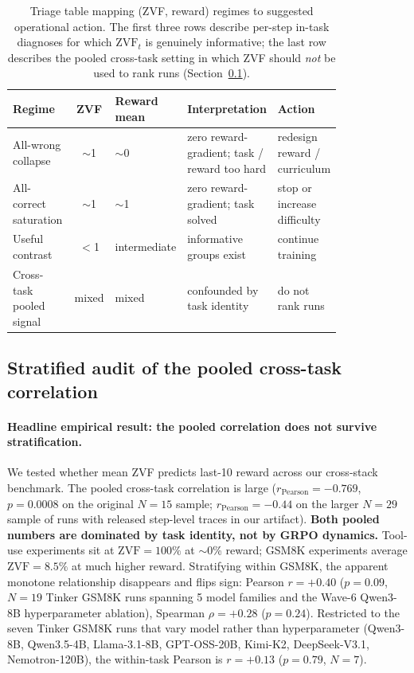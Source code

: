\documentclass{article}
\begin{document}
\begin{table}[t]
\centering\small
\setlength{\tabcolsep}{5pt}
\begin{tabular}{p{0.22\linewidth}cp{0.13\linewidth}p{0.27\linewidth}p{0.20\linewidth}}
\toprule
\textbf{Regime} & \textbf{ZVF} & \textbf{Reward mean} & \textbf{Interpretation} & \textbf{Action} \\
\midrule
All-wrong collapse & $\sim$1 & $\sim$0 &
zero reward-gradient; task / reward too hard &
redesign reward / curriculum \\
All-correct saturation & $\sim$1 & $\sim$1 &
zero reward-gradient; task solved &
stop or increase difficulty \\
Useful contrast & $<$1 & intermediate &
informative groups exist &
continue training \\
Cross-task pooled signal & mixed & mixed &
confounded by task identity &
do not rank runs \\
\bottomrule
\end{tabular}
\caption{Triage table mapping (ZVF, reward) regimes to suggested
operational action. The first three rows describe per-step in-task
diagnoses for which $\mathrm{ZVF}_t$ is genuinely informative; the last
row describes the pooled cross-task setting in which ZVF should
\emph{not} be used to rank runs (Section~\ref{sec:zvf-stratification}).}
\label{tab:zvf-triage}
\end{table}

\subsection{Stratified audit of the pooled cross-task correlation}
\label{sec:zvf-stratification}
\label{sec:zvf-analysis}

\paragraph{Headline empirical result: the pooled correlation does not
survive stratification.}
We tested whether mean ZVF predicts last-10 reward across our cross-stack
benchmark. The pooled cross-task correlation is large ($r_{\text{Pearson}}
= -0.769$, $p = 0.0008$ on the original $N{=}15$ sample;
$r_{\text{Pearson}} = -0.44$ on the larger $N{=}29$ sample of runs with
released step-level traces in our artifact). \textbf{Both pooled numbers
are dominated by task identity, not by GRPO dynamics.} Tool-use experiments
sit at $\mathrm{ZVF} = 100\%$ at $\sim$0\% reward; GSM8K experiments
average $\mathrm{ZVF} = 8.5\%$ at much higher reward. Stratifying within
GSM8K, the apparent monotone relationship disappears and flips sign:
Pearson $r = +0.40$ ($p = 0.09$, $N{=}19$ Tinker GSM8K runs spanning 5
model families and the Wave-6 Qwen3-8B hyperparameter ablation), Spearman
$\rho = +0.28$ ($p = 0.24$). Restricted to the seven Tinker GSM8K runs that
vary model rather than hyperparameter (Qwen3-8B, Qwen3.5-4B,
Llama-3.1-8B, GPT-OSS-20B, Kimi-K2, DeepSeek-V3.1, Nemotron-120B), the
within-task Pearson is $r = +0.13$ ($p = 0.79$, $N{=}7$).
\end{document}
